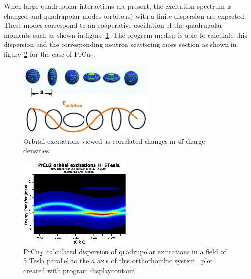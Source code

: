 When large  quadrupolar interactions are present, the excitation spectrum is changed and
quadrupolar modes (orbitons) with a finite dispersion are expected. 
These modes correspond to an cooperative oscillation of the quadrupolar moments such as shown
in figure~\ref{qmodes}.
The program {\prg mcdisp}
is able to calculate this dispersion and the corresponding neutron scattering cross section as shown
in figure~\ref{qintensity} for the case of PrCu$_2$. 
 

\begin{figure}[hb]%
\begin{center}\leavevmode
\includegraphics[angle=0, width=0.6\textwidth]{figsrc/orbiton.ps}
\end{center}
\caption{Orbital excitations viewed  as correlated changes in 4f-charge densities.}
\label{qmodes}
\end{figure}

\begin{figure}[hb]%
\begin{center}\leavevmode
\includegraphics[angle=0, width=0.5\textwidth]{figsrc/prcu2_0k0_5T.eps}
\end{center}
\caption{PrCu$_2$: calculated dispersion of quadrupolar excitations in a field of 5 Tesla parallel to the $a$ axis %
of this orthorhombic system.
[plot created with program {\prg displaycontour}]}
\label{qintensity}
\end{figure}

\clearpage